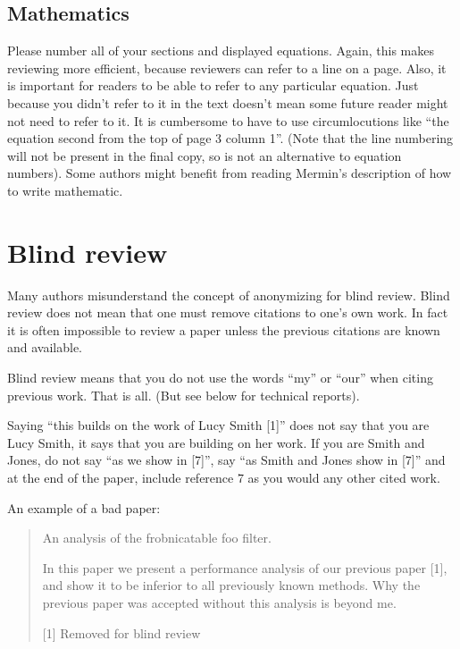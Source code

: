 \documentclass[runningheads]{llncs}
\begin{document}
\subsection{Mathematics}

Please number all of your sections and displayed equations.  Again,
this makes reviewing more efficient, because reviewers can refer to a
line on a page.  Also, it is important for readers to be able to refer
to any particular equation.  Just because you didn't refer to it in
the text doesn't mean some future reader might not need to refer to
it.  It is cumbersome to have to use circumlocutions like ``the
equation second from the top of page 3 column 1''.  (Note that the
line numbering will not be present in the final copy, so is not an
alternative to equation numbers).  Some authors might benefit from
reading Mermin's description of how to write mathematic.

\section{Blind review}
\label{sec:blind}

Many authors misunderstand the concept of anonymizing for blind
review.  Blind review does not mean that one must remove
citations to one's own work. In fact it is often impossible to
review a paper unless the previous citations are known and
available.

Blind review means that you do not use the words ``my'' or ``our''
when citing previous work.  That is all.  (But see below for
technical reports).

Saying ``this builds on the work of Lucy Smith [1]'' does not say
that you are Lucy Smith, it says that you are building on her
work.  If you are Smith and Jones, do not say ``as we show in
[7]'', say ``as Smith and Jones show in [7]'' and at the end of the
paper, include reference 7 as you would any other cited work.

An example of a bad paper:
\begin{quote}
\begin{center}
    An analysis of the frobnicatable foo filter.
\end{center}

   In this paper we present a performance analysis of our
   previous paper [1], and show it to be inferior to all
   previously known methods.  Why the previous paper was
   accepted without this analysis is beyond me.

   [1] Removed for blind review
\end{quote}
\end{document}
